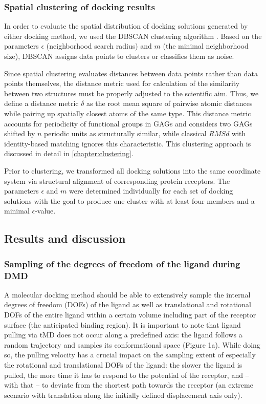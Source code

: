 \subsubsection{Spatial clustering of docking results}

In order to evaluate the spatial distribution of docking solutions generated by
either docking method, we used the DBSCAN clustering algorithm
\cite{dbscan_ester1996}. Based on the  parameters $\epsilon$ (neighborhood
search radius) and $m$ (the minimal neighborhood size), DBSCAN assigns data
points to clusters or classifies them as noise.

Since spatial clustering evaluates distances between data points rather than
data points themselves, the distance metric used for calculation of the
similarity between two structures must be properly adjusted to the scientific
aim. Thus, we define a distance metric $\delta$ as the root mean square of
pairwise atomic distances while pairing up spatially closest atoms of the same
type. This distance metric accounts for periodicity of functional groups in GAGs
and considers two GAGs shifted by $n$ periodic units as structurally similar,
while classical $RMSd$ with identity-based matching ignores this characteristic.
This clustering approach is discussed in detail in \cref{chapter:clustering}.

Prior to clustering, we transformed all docking solutions into the same
coordinate system via structural alignment of corresponding protein receptors.
The parameters $\epsilon$ and $m$ were determined individually for each set of
docking solutions with the goal to produce one cluster with at least four
members and a minimal $\epsilon$-value.


\subsection{Results and discussion}

\subsubsection{Sampling of the degrees of freedom of the ligand during DMD}

A molecular docking method should be able to extensively sample the internal
degrees of freedom (DOFs) of the ligand as well as translational and rotational
DOFs of the entire ligand within a certain volume including part of the receptor
surface (the anticipated binding region). It is important to note that ligand
pulling via tMD does not occur along a predefined axis: the ligand follows a
random trajectory and samples its conformational space (Figure 1a). While doing
so, the pulling velocity has a crucial impact on the sampling extent of
especially the rotational and translational DOFs of the ligand: the slower the
ligand is pulled, the more time it has to respond to the potential of the
receptor, and -- with that -- to deviate from the shortest path towards the
receptor (an extreme scenario with translation along the initially defined
displacement axis only).

